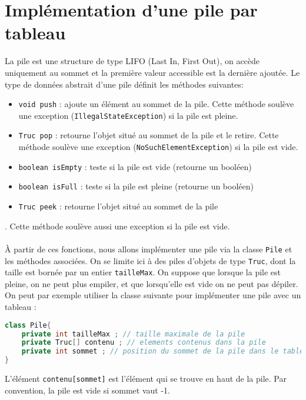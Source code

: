 \documentclass[iutinfo,a4paper,nocorrections,10pt]{ustl-tdtp}
\date{\annee{2018}--\annee{2019}}
\begin{document}
\maketitle
\thispagestyle{empty}


\section{Implémentation d'une pile par tableau}\label{implem}



La pile est une structure de type LIFO (Last In, First Out), on accède uniquement au sommet et la première valeur accessible est la dernière ajoutée. Le type de données abstrait d'une pile définit les méthodes suivantes:

\begin{itemize}
\item \texttt{void push} : ajoute un élément au sommet de la pile. Cette méthode soulève une exception (\texttt{IllegalStateException}) si la pile est pleine. 
\item \texttt{Truc pop} : retourne l’objet situé au sommet de la pile et le retire. Cette méthode soulève une exception (\texttt{NoSuchElementException}) si la pile est vide. 
\item \texttt{boolean isEmpty} : teste si la pile est vide (retourne un booléen)
\item \texttt{boolean isFull} : teste si la pile est pleine (retourne un booléen)
\item \texttt{Truc peek} : retourne l'objet situé au sommet de la pile
\end{itemize}. Cette méthode soulève aussi une exception si la pile est vide.
\paragraph{}
À partir de ces fonctions, nous allons implémenter une pile via la classe \texttt{Pile} et les méthodes associées. On se limite ici à des piles d'objets de type \texttt{Truc}, dont la taille est bornée par un entier \texttt{tailleMax}. On suppose que lorsque la pile est pleine, on ne peut plus empiler, et que lorsqu’elle est vide on ne peut pas dépiler. 
On peut par exemple utiliser la classe suivante pour implémenter une pile avec un tableau :

\begin{lstlisting}[language=Java]
class Pile{
	private int tailleMax ; // taille maximale de la pile
	private Truc[] contenu ; // elements contenus dans la pile
	private int sommet ; // position du sommet de la pile dans le tableau
}

\end{lstlisting}
L'élément \texttt{contenu[sommet]} est l'élément qui se trouve en haut de la pile. Par convention, la pile est vide si sommet vaut -1.
\end{document}
